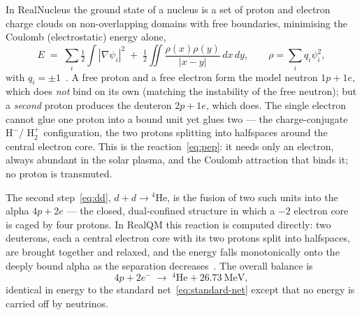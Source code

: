 \documentclass[11pt]{article}
\begin{document}
In RealNucleus the ground state of a nucleus is a set of proton and electron charge clouds on
non-overlapping domains with free boundaries, minimising the Coulomb (electrostatic) energy alone,
\begin{equation}
E \;=\; \sum_i \tfrac{1}{2}\!\int|\nabla\psi_i|^2
\;+\; \tfrac12\!\iint\frac{\rho(x)\rho(y)}{|x-y|}\,dx\,dy, \qquad \rho=\sum_i q_i\psi_i^2 ,
\label{eq:energy}
\end{equation}
with $q_i=\pm1$~\cite{Johnson-RealQM,Johnson-RealNucleus}. A free proton and a free electron form the
model neutron $1p+1e$, which does \emph{not} bind on its own (matching the instability of the free
neutron); but a \emph{second} proton produces the deuteron $2p+1e$, which does. The single electron
cannot glue one proton into a bound unit yet glues two --- the charge-conjugate $\mathrm{H}^-$/
$\mathrm{H}_2^{+}$ configuration, the two protons splitting into halfspaces around the central electron
core. This is the reaction~\eqref{eq:pep}: it needs only an electron, always abundant in the solar
plasma, and the Coulomb attraction that binds it; no proton is transmuted.

The second step~\eqref{eq:dd}, $d+d\to{}^4\mathrm{He}$, is the fusion of two such units into the alpha
$4p+2e$ --- the closed, dual-confined structure in which a $-2$ electron core is caged by four
protons. In RealQM this reaction is computed directly: two deuterons, each a central electron core
with its two protons split into halfspaces, are brought together and relaxed, and the energy falls
monotonically onto the deeply bound alpha as the separation decreases~\cite{Johnson-RealNucleus}. The
overall balance is
\begin{equation}
4p + 2e^- \;\longrightarrow\; {}^4\mathrm{He} + 26.73~\text{MeV},
\label{eq:coulomb-net}
\end{equation}
identical in energy to the standard net~\eqref{eq:standard-net} except that no energy is carried off by
neutrinos.
\end{document}

